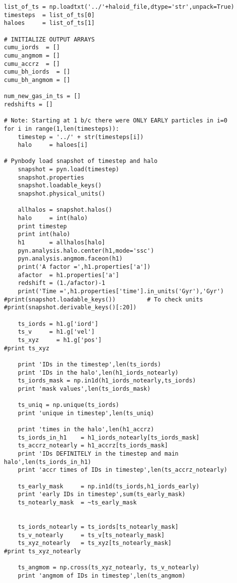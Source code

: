 \documentclass[12pt,headA,chapB]{fiskthesis}
\begin{document}
\begin{verbatim}
list_of_ts = np.loadtxt('../'+haloid_file,dtype='str',unpack=True)
timesteps  = list_of_ts[0]
haloes     = list_of_ts[1] 

# INITIALIZE OUTPUT ARRAYS
cumu_iords  = []
cumu_angmom = []
cumu_accrz  = []
cumu_bh_iords  = []
cumu_bh_angmom = [] 

num_new_gas_in_ts = []
redshifts = []

# Note: Starting at 1 b/c there were ONLY EARLY particles in i=0 
for i in range(1,len(timesteps)):
    timestep = '../' + str(timesteps[i])
    halo     = haloes[i]    

# Pynbody load snapshot of timestep and halo
    snapshot = pyn.load(timestep)
    snapshot.properties
    snapshot.loadable_keys()
    snapshot.physical_units()
    
    allhalos = snapshot.halos()            
    halo     = int(halo)
    print timestep
    print int(halo)
    h1       = allhalos[halo]
    pyn.analysis.halo.center(h1,mode='ssc')
    pyn.analysis.angmom.faceon(h1)
    print('A factor =',h1.properties['a'])
    afactor  = h1.properties['a']
    redshift = (1./afactor)-1
    print('Time =',h1.properties['time'].in_units('Gyr'),'Gyr')
#print(snapshot.loadable_keys())         # To check units
#print(snapshot.derivable_keys()[:20])

    ts_iords = h1.g['iord']
    ts_v     = h1.g['vel']
    ts_xyz     = h1.g['pos']
#print ts_xyz

    print 'IDs in the timestep',len(ts_iords)
    print 'IDs in the halo',len(h1_iords_notearly)
    ts_iords_mask = np.in1d(h1_iords_notearly,ts_iords)
    print 'mask values',len(ts_iords_mask)

    ts_uniq = np.unique(ts_iords)
    print 'unique in timestep',len(ts_uniq) 
    
    print 'times in the halo',len(h1_accrz)
    ts_iords_in_h1    = h1_iords_notearly[ts_iords_mask]    
    ts_accrz_notearly = h1_accrz[ts_iords_mask]
    print 'IDs DEFINITELY in the timestep and main halo',len(ts_iords_in_h1)
    print 'accr times of IDs in timestep',len(ts_accrz_notearly)

    ts_early_mask     = np.in1d(ts_iords,h1_iords_early)
    print 'early IDs in timestep',sum(ts_early_mask)
    ts_notearly_mask  = ~ts_early_mask


    ts_iords_notearly = ts_iords[ts_notearly_mask]
    ts_v_notearly     = ts_v[ts_notearly_mask]
    ts_xyz_notearly   = ts_xyz[ts_notearly_mask]
#print ts_xyz_notearly

    ts_angmom = np.cross(ts_xyz_notearly, ts_v_notearly)
    print 'angmom of IDs in timestep',len(ts_angmom)


\end{verbatim}
\end{document}
